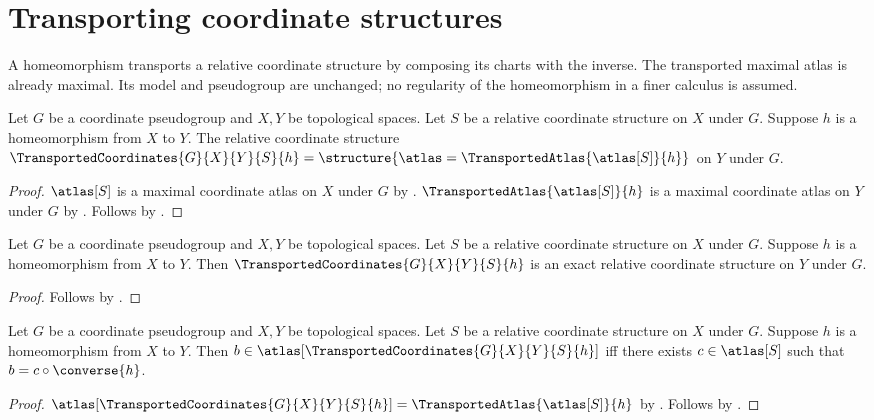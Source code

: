 \section{Transporting coordinate structures}



A homeomorphism transports a relative coordinate structure by composing its
charts with the inverse. The transported maximal atlas is already maximal.
Its model and pseudogroup are unchanged; no regularity of the homeomorphism
in a finer calculus is assumed.

\begin{construction}\label{transported_coordinates}
    Let $G$ be a coordinate pseudogroup and $X,Y$ be topological spaces.
    Let $S$ be a relative coordinate structure on $X$ under $G$.
    Suppose $h$ is a homeomorphism from $X$ to $Y$.
    The relative coordinate structure $\TransportedCoordinates{G}{X}{Y}{S}{h}=
        \structure{\atlas=\TransportedAtlas{\atlas[S]}{h}}$ on $Y$ under $G$.
\end{construction}
\begin{proof}
    $\atlas[S]$ is a maximal coordinate atlas on $X$ under $G$ by .
    $\TransportedAtlas{\atlas[S]}{h}$ is a maximal coordinate atlas on $Y$ under $G$ by
        .
    Follows by .
\end{proof}

\begin{theorem}\label{transported_coordinates_is_exact}
    Let $G$ be a coordinate pseudogroup and $X,Y$ be topological spaces.
    Let $S$ be a relative coordinate structure on $X$ under $G$.
    Suppose $h$ is a homeomorphism from $X$ to $Y$.
    Then $\TransportedCoordinates{G}{X}{Y}{S}{h}$ is an exact relative coordinate structure
        on $Y$ under $G$.
\end{theorem}
\begin{proof}
    Follows by .
\end{proof}

\begin{theorem}\label{transported_coordinates_chart_iff}
    Let $G$ be a coordinate pseudogroup and $X,Y$ be topological spaces.
    Let $S$ be a relative coordinate structure on $X$ under $G$.
    Suppose $h$ is a homeomorphism from $X$ to $Y$.
    Then $b\in\atlas[\TransportedCoordinates{G}{X}{Y}{S}{h}]$ iff
        there exists $c\in\atlas[S]$ such that $b=c\circ\converse{h}$.
\end{theorem}
\begin{proof}
    $\atlas[\TransportedCoordinates{G}{X}{Y}{S}{h}]=\TransportedAtlas{\atlas[S]}{h}$ by
        .
    Follows by .
\end{proof}

